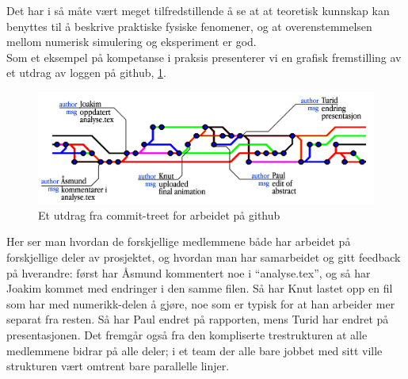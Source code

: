 Det har i så måte vært meget tilfredstillende å se at at teoretisk kunnskap kan
benyttes til å beskrive praktiske fysiske fenomener, og at overenstemmelsen
mellom numerisk simulering og eksperiment er god. \\


Som et eksempel på kompetanse i praksis presenterer vi en grafisk fremstilling
av et utdrag av loggen på github, \cref{fig:github}.
\begin{figure}[H]
  \begin{center}
    \includegraphics[width=1.1\textwidth]{github.png}
  \end{center}
  \caption{Et utdrag fra commit-treet for arbeidet på github}
  \label{fig:github}
\end{figure}
Her ser man hvordan de forskjellige medlemmene både har arbeidet på forskjellige
deler av prosjektet, og hvordan man har samarbeidet og gitt feedback på
hverandre: først har Åsmund kommentert noe i ``analyse.tex'', og så har Joakim kommet med
endringer i den samme filen. Så har Knut lastet opp en fil som har med
numerikk-delen å gjøre, noe som er typisk for at han arbeider mer separat fra
resten. Så har Paul endret på rapporten, mens Turid har endret på
presentasjonen. Det fremgår også fra den kompliserte trestrukturen at alle
medlemmene bidrar på alle deler; i et team der alle bare jobbet med sitt ville
strukturen vært omtrent bare parallelle linjer.\\

